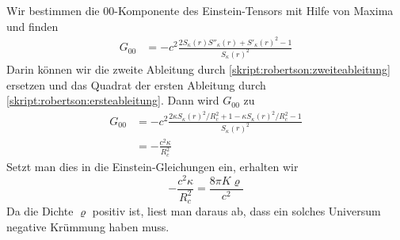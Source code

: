 Wir bestimmen die $00$-Komponente des Einstein-Tensors mit Hilfe
von Maxima und finden
\begin{align*}
G_{00}
&=
-c^2\frac{ 2S_\kappa(r)S''_\kappa(r) + S'_\kappa(r)^2-1 }{S_\kappa(r)^2}
\end{align*}
Darin können wir die zweite Ableitung durch
\eqref{skript:robertson:zweiteableitung}
ersetzen und das Quadrat der ersten Ableitung durch
\eqref{skript:robertson:ersteableitung}.
Dann wird $G_{00}$ zu
\begin{align*}
G_{00}
&=
-c^2\frac{2\kappa S_\kappa(r)^2/R_c^2 + 1-\kappa S_\kappa(r)^2/R_c^2-1 }{S_\kappa(r)^2}
\\
&=
-\frac{c^2\kappa}{R_c^2}
\end{align*}
Setzt man dies in die Einstein-Gleichungen ein, erhalten wir
\begin{equation}
-\frac{c^2\kappa}{R_c^2}=\frac{8\pi K\varrho}{c^2}
\end{equation}
Da die Dichte $\varrho$ positiv ist, liest man daraus ab, dass ein solches
Universum negative Krümmung haben muss.

